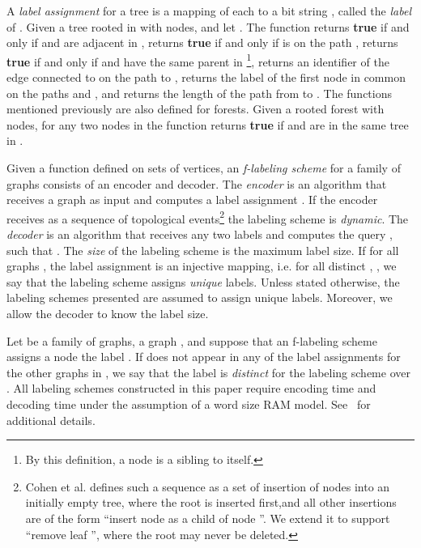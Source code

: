 \documentclass{llncs}
\begin{document}
A \emph{label assignment}  for a tree  is a mapping of each 
	to a bit  string , called  the \emph{label} of .
Given  a tree  rooted in  with  nodes, and let .
	The function  returns \textbf{true} if and only if  and  are adjacent in ,
	   returns \textbf{true} if and only if  is on the path ,
	   returns \textbf{true} if and only if  and  have the same parent in \footnote{By this definition, a node is a sibling to itself.},
	   returns an identifier  of the edge connected to   on the path to  ,
	   returns the label of the first node in common on the paths  and ,
	and  returns the length of the path from  to .
	The functions mentioned previously are also defined for forests.
	Given a rooted forest  with  nodes, for any two nodes  in  the function   returns  \textbf{true}  if  and  are in the same tree in .


	Given a function  defined on sets of vertices,
	 an  \emph{ f-labeling scheme} for a family of graphs  consists   of  an encoder  and decoder.
	The  \emph{encoder}  is an algorithm that receives a graph  as input and  computes a label assignment . If the encoder receives  as a sequence of topological events\footnote{Cohen et al. defines such a sequence as  a set of insertion of nodes into an initially empty tree, where the root is inserted first,and all other insertions are of the form ``insert node  as a child of node ''.  We extend it to support ``remove leaf '', where the root may never be deleted. } the labeling scheme is \emph{dynamic}.
	 The \emph{decoder}  is an algorithm  that receives any two labels   and  computes the query , such that  . The \emph{size} of the labeling scheme is the maximum label size.
	 If for all graphs  , the label assignment   is an injective mapping, i.e. for all distinct , , we say that the labeling scheme assigns \emph{unique} labels. Unless stated otherwise, the labeling schemes presented are assumed to assign unique labels. Moreover, we allow the decoder to know the label size.

	 Let  be a family of graphs, a graph , and suppose that an f-labeling scheme assigns a node  the label .
	  If  does not appear in any of the label assignments for the other graphs in , we say that the label is \emph{distinct} for the labeling scheme over .
All labeling schemes constructed in this paper require  encoding time and  decoding time under the assumption of a  word size RAM model. See~\cite{Thorup01} for additional details.
\end{document}

